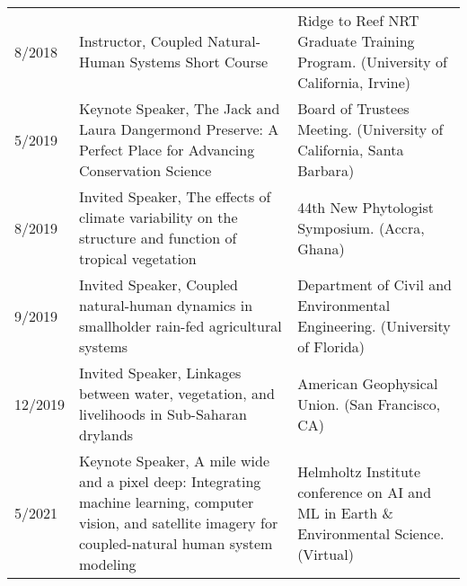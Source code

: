 \begin{longtable}{lp{7.0cm}p{6.5cm}}
8/2018 & Instructor, Coupled Natural-Human Systems Short Course & Ridge to Reef NRT Graduate Training Program. (University of California, Irvine) \\
5/2019 & Keynote Speaker, The Jack and Laura Dangermond Preserve: A Perfect Place for Advancing Conservation Science & Board of Trustees Meeting. (University of California, Santa Barbara) \\
8/2019 & Invited Speaker, The effects of climate variability on the structure and function of tropical vegetation & 44th New Phytologist Symposium. (Accra, Ghana) \\
9/2019 & Invited Speaker, Coupled natural-human dynamics in smallholder rain-fed agricultural systems & Department of Civil and Environmental Engineering. (University of Florida) \\
12/2019 & Invited Speaker, Linkages between water, vegetation, and livelihoods in Sub-Saharan drylands & American Geophysical Union. (San Francisco, CA) \\
5/2021 & Keynote Speaker, A mile wide and a pixel deep: Integrating machine learning, computer vision, and satellite imagery for coupled-natural human system modeling & Helmholtz Institute conference on AI and ML in Earth \& Environmental Science. (Virtual) \\
\end{longtable}

